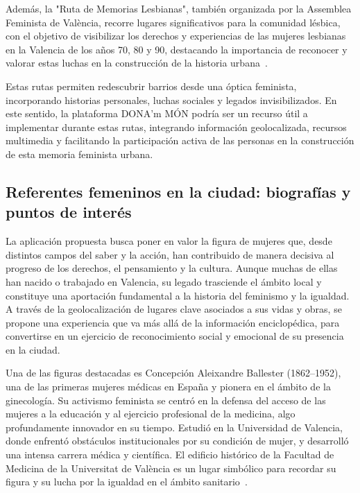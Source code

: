 Además, la "Ruta de Memorias Lesbianas", también organizada por la Assemblea Feminista de València, recorre lugares significativos para la comunidad lésbica, con el objetivo de visibilizar los derechos y experiencias de las mujeres lesbianas en la Valencia de los años 70, 80 y 90, destacando la importancia de reconocer y valorar estas luchas en la construcción de la historia urbana~\cite{assemblea2024}.

Estas rutas permiten redescubrir barrios desde una óptica feminista, incorporando historias personales, luchas sociales y legados invisibilizados. En este sentido, la plataforma DONA’m MÓN podría ser un recurso útil a implementar durante estas rutas, integrando información geolocalizada, recursos multimedia y facilitando la participación activa de las personas en la construcción de esta memoria feminista urbana. 


\subsection{Referentes femeninos en la ciudad: biografías y puntos de interés}

La aplicación propuesta busca poner en valor la figura de mujeres que, desde distintos campos del saber y la acción, han contribuido de manera decisiva al progreso de los derechos, el pensamiento y la cultura. Aunque muchas de ellas han nacido o trabajado en Valencia, su legado trasciende el ámbito local y constituye una aportación fundamental a la historia del feminismo y la igualdad. A través de la geolocalización de lugares clave asociados a sus vidas y obras, se propone una experiencia que va más allá de la información enciclopédica, para convertirse en un ejercicio de reconocimiento social y emocional de su presencia en la ciudad.

Una de las figuras destacadas es Concepción Aleixandre Ballester (1862–1952), una de las primeras mujeres médicas en España y pionera en el ámbito de la ginecología. Su activismo feminista se centró en la defensa del acceso de las mujeres a la educación y al ejercicio profesional de la medicina, algo profundamente innovador en su tiempo. Estudió en la Universidad de Valencia, donde enfrentó obstáculos institucionales por su condición de mujer, y desarrolló una intensa carrera médica y científica. El edificio histórico de la Facultad de Medicina de la Universitat de València es un lugar simbólico para recordar su figura y su lucha por la igualdad en el ámbito sanitario~\cite{guijarro2021}.

